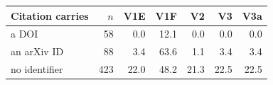 \begin{tabular}{lrrrrrr}
\toprule
Citation carries & $n$ & V1E & V1F & V2 & V3 & V3a \\
\midrule
a DOI & 58 & 0.0 & 12.1 & 0.0 & 0.0 & 0.0 \\
an arXiv ID & 88 & 3.4 & 63.6 & 1.1 & 3.4 & 3.4 \\
no identifier & 423 & 22.0 & 48.2 & 21.3 & 22.5 & 22.5 \\
\bottomrule
\end{tabular}
